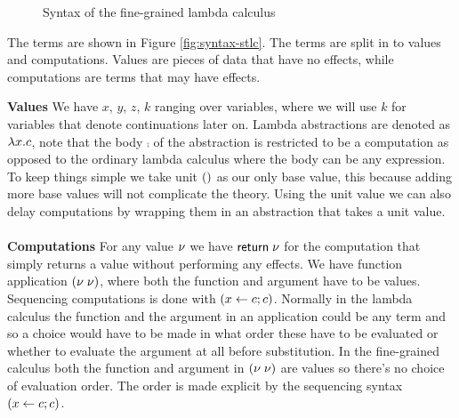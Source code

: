 {%

\begin{figure}
\caption{Syntax of the fine-grained lambda calculus}
\centering
{}
\end{figure}

The terms are shown in Figure \ref{fig:syntax-stlc}.
The terms are split in to values and computations.
Values are pieces of data that have no effects, while computations are terms that may have effects.

\textbf{Values} We have $x$, $y$, $z$, $k$ ranging over variables, where we will use $k$ for variables that denote continuations later on.
Lambda abstractions are denoted as $\lambda x . c$, note that the body $\comp$ of the abstraction is restricted to be a computation as opposed to the ordinary lambda calculus where the body can be any expression.
To keep things simple we take unit $()$ as our only base value, this because adding more base values will not complicate the theory.
Using the unit value we can also delay computations by wrapping them in an abstraction that takes a unit value.
\\\\
\textbf{Computations} For any value $\nu$ we have $\mathsf{return} \; \nu$ for the computation that simply returns a value without performing any effects. We have function application $(\nu \; \nu)$, where both the function and argument have to be values. Sequencing computations is done with $(x \leftarrow c ; c)$. Normally in the lambda calculus the function and the argument in an application could be any term and so a choice would have to be made in what order these have to be evaluated or whether to evaluate the argument at all before substitution. In the fine-grained calculus both the function and argument in $(\nu \; \nu)$ are values so there's no choice of evaluation order. The order is made explicit by the sequencing syntax $(x \leftarrow c ; c)$.

}
